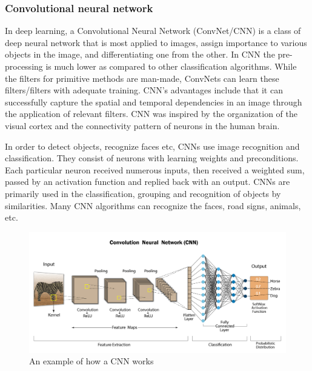 \subsubsection*{Convolutional neural network}
In deep learning, a Convolutional Neural Network (ConvNet/CNN) is a class of deep neural network that is most applied to images, assign importance to various objects in the image, and differentiating one from the other. In CNN the pre-processing is much lower as compared to other classification algorithms. While the filters for primitive methods are man-made, ConvNets can learn these filters/filters with adequate training. CNN's advantages include that it can successfully capture the spatial and temporal dependencies in an image through the application of relevant filters. CNN was inspired by the organization of the visual cortex and the connectivity pattern of neurons in the human brain\cite{saha_comprehensive_2018}. 

In order to detect objects, recognize faces etc, CNNs use image recognition and classification. They consist of neurons with learning weights and preconditions. Each particular neuron received numerous inputs, then received a weighted sum, passed by an activation function and replied back with an output. CNNs are primarily used in the classification, grouping and recognition of objects by similarities. Many CNN algorithms can recognize the faces, road signs, animals, etc\cite{bansari_introduction_2019}.

\begin{figure}[h]
    \centering
    \includegraphics[width=1\textwidth]{graphics/methods/cnn.png}
    \caption{An example of how a CNN works\cite{e_convolutional_2020}}
    \label{fig:cnn}
\end{figure}


